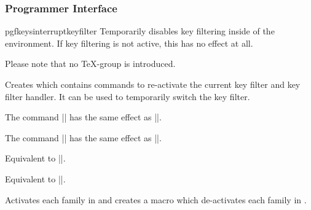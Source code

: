 \subsubsection{Programmer Interface}
\label{section-key-filter-api}%
\begin{plainenvironment}{{pgfkeysinterruptkeyfilter}}%
	Temporarily disables key filtering inside of the environment. If key filtering is not active, this has no effect at all.

	Please note that no \TeX-group is introduced.
\end{plainenvironment}

\begin{command}{\pgfkeyssavekeyfilterstateto{}}
Creates  which contains commands to re-activate the current
key filter and key filter handler. It can be used to temporarily
switch the key filter.
\end{command}

\begin{command}{\pgfkeysinstallkeyfilter{}}%
	The command || has the same effect as ||.
\end{command}

\begin{command}{\pgfkeysinstallkeyfilterhandler{}}%
	The command || has the same effect as ||.
\end{command}


\begin{command}{\pgfkeysactivatefamily{}}%
	Equivalent to ||.
\end{command}

\begin{command}{\pgfkeysdeactivatefamily{}}%
	Equivalent to ||.
\end{command}

\begin{command}{\pgfkeysactivatefamilies{}}%
	Activates each family in  and creates a macro  which de-activates each family in .
\begin{codeexample}
\deactivatename
\end{codeexample}
\end{command}


